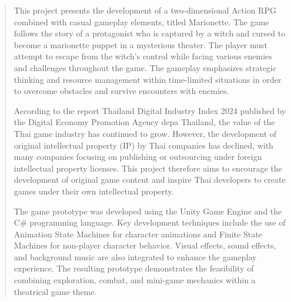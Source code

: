 \begin{abstract}
This project presents the development of a two-dimensional Action RPG combined with casual gameplay elements, titled Marionette. The game follows the story of a protagonist who is captured by a witch and cursed to become a marionette puppet in a mysterious theater. The player must attempt to escape from the witch’s control while facing various enemies and challenges throughout the game. The gameplay emphasizes strategic thinking and resource management within time-limited situations in order to overcome obstacles and survive encounters with enemies.

According to the report Thailand Digital Industry Index 2024 published by the Digital Economy Promotion Agency depa Thailand, the value of the Thai game industry has continued to grow. However, the development of original intellectual property (IP) by Thai companies has declined, with many companies focusing on publishing or outsourcing under foreign intellectual property licenses. This project therefore aims to encourage the development of original game content and inspire Thai developers to create games under their own intellectual property.

The game prototype was developed using the Unity Game Engine and the C\# programming language. Key development techniques include the use of Animation State Machines for character animations and Finite State Machines for non-player character behavior. Visual effects, sound effects, and background music are also integrated to enhance the gameplay experience. The resulting prototype demonstrates the feasibility of combining exploration, combat, and mini-game mechanics within a theatrical game theme.
\end{abstract}

%

\contentspage

\ifproject




